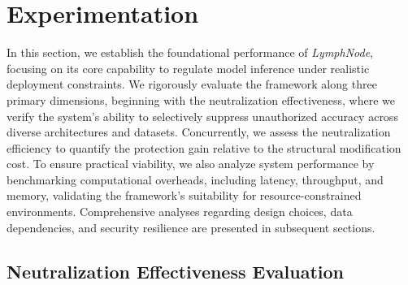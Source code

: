 \documentclass[conference]{IEEEtran}
\begin{document}


\section{Experimentation}
\label{sec:Experiment}

In this section, we establish the foundational performance of \textit{LymphNode}, focusing on its core capability to regulate model inference under realistic deployment constraints. We rigorously evaluate the framework along three primary dimensions, beginning with the neutralization effectiveness, where we verify the system's ability to selectively suppress unauthorized accuracy across diverse architectures and datasets. Concurrently, we assess the neutralization efficiency to quantify the protection gain relative to the structural modification cost. To ensure practical viability, we also analyze system performance by benchmarking computational overheads, including latency, throughput, and memory, validating the framework's suitability for resource-constrained environments. Comprehensive analyses regarding design choices, data dependencies, and security resilience are presented in subsequent sections.



\subsection{Neutralization Effectiveness Evaluation}
\label{sec:exp_effectiveness}
\end{document}
